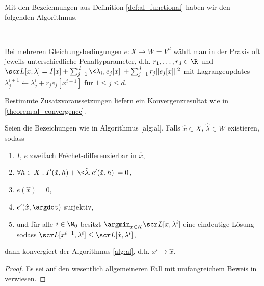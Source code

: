\documentclass{mythesis}
\begin{document}
\begin{algorithm} \label{alg:al}
    Mit den Bezeichnungen aus Definition \ref{def:al_functional} haben wir den folgenden Algorithmus.

    \begin{samepage}
	\\
	\begin{algorithmic}
	    \EndFor
	\end{algorithmic}
    \end{samepage}
    \begin{note}
	Bei mehreren Gleichungsbedingungen $e: X \to W = V^d$ wählt man in der Praxis oft jeweils unterschiedliche Penaltyparameter, d.h. $r_1, \dotsc, r_d \in \R$ und
	\begin{math}
	    \scr L[x, \lambda] = I[x] + \sum_{j=1}^d \<\lambda_i, e_j[x]\> + \sum_{j=1}^d r_j \|e_j[x]\|^2
	\end{math}
	mit Lagrangeupdates $\lambda^{i+1}_j \gets \lambda^i_j + r_j e_j[x^{i+1}]$ für $1 \le j \le d$.
    \end{note}
\end{algorithm}

Bestimmte Zusatzvoraussetzungen liefern ein Konvergenzresultat wie in \ref{theorem:al_convergence}.

\begin{theorem} \label{theorem:al_convergence}
    Seien die Bezeichungen wie in Algorithmus \ref{alg:al}.
    Falls $\hat x \in X$, $\hat \lambda \in W$ existieren, sodass
    \begin{enumerate}[1)]
        \item
	    $I$, $e$ zweifach Fréchet-differenzierbar in $\hat x$,
	\item
	    $\forall h \in X: I'(\hat x,h) + \<\hat\lambda, e'(\hat x,h)\> = 0$,
	\item
	    $e(\hat x) = 0$,
	\item
	    $e'(\hat x, \argdot)$ surjektiv,
	\item
	    und für alle $i \in \N_0$ besitzt $\argmin_{x\in K} \scr L[x,\lambda^i]$ eine eindeutige Lösung sodass
	    $\scr L[x^{i+1}, \lambda^i] \le \scr L[\hat x, \lambda^i]$,
    \end{enumerate}
    dann konvergiert der Algorithmus \ref{alg:al}, d.h. $x^i \to \hat x$.
    \begin{proof}
        Es sei auf den wesentlich allgemeineren Fall mit umfangreichem Beweis in \cite[§3]{ito2008lagrange} verwiesen.
    \end{proof}
\end{theorem}
\end{document}

